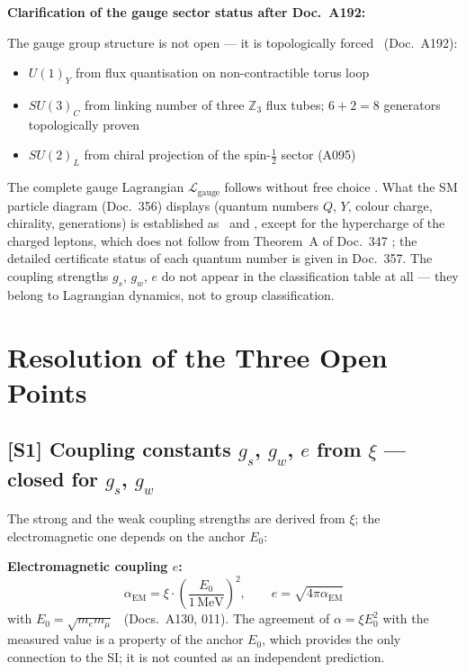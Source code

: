 \textbf{Clarification of the gauge sector status after Doc.~A192:}

The gauge group structure is not open --- it is topologically forced \BM\ (Doc.~A192):
\begin{itemize}
  \item $U(1)_Y$ from flux quantisation on non-contractible torus loop \BM
  \item $SU(3)_C$ from linking number of three $\mathbb{Z}_3$ flux tubes;
    $6+2=8$ generators topologically proven \BM
  \item $SU(2)_L$ from chiral projection of the spin-$\tfrac{1}{2}$ sector (A095) \BM
\end{itemize}

The complete gauge Lagrangian $\mathcal{L}_\text{gauge}$ follows without
free choice \BM. What the SM particle diagram (Doc.~356) displays
(quantum numbers $Q$, $Y$, colour charge, chirality, generations) is
established as \BM\ and \KM, except for the hypercharge of the charged
leptons, which does not follow from Theorem~A of Doc.~347 \SM; the detailed certificate status of each
quantum number is given in Doc.~357. The coupling strengths
$g_s$, $g_w$, $e$ do not appear in the classification table at all ---
they belong to Lagrangian dynamics, not to group classification.

\section{Resolution of the Three Open Points}

\subsection*{[S1] Coupling constants $g_s$, $g_w$, $e$ from $\xi$ --- closed for $g_s$, $g_w$ \KM}

The strong and the weak coupling strengths are derived from $\xi$; the
electromagnetic one depends on the anchor $E_0$:

\textbf{Electromagnetic coupling $e$:}
\begin{equation}
  \alpha_\text{EM} = \xi \cdot \left(\frac{E_0}{1\,\text{MeV}}\right)^2,
  \qquad e = \sqrt{4\pi\alpha_\text{EM}}
\end{equation}
with $E_0 = \sqrt{m_e m_\mu}$ \KM\ (Docs.~A130, 011). The agreement of
$\alpha = \xi E_0^2$ with the measured value is a property of the anchor $E_0$,
which provides the only connection to the SI; it is not counted as an
independent prediction.

